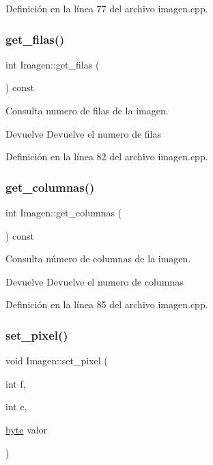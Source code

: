 Definición en la línea 77 del archivo imagen.\+cpp.

\mbox{\label{classImagen_a9cfbba6e40009767ec56197631f63d7e}} 
\subsubsection{\texorpdfstring{get\+\_\+filas()}{get\_filas()}}
{\footnotesize\ttfamily int Imagen\+::get\+\_\+filas (\begin{DoxyParamCaption}{ }\end{DoxyParamCaption}) const}



Consulta numero de filas de la imagen. 

\begin{DoxyReturn}{Devuelve}
Devuelve el numero de filas 
\end{DoxyReturn}


Definición en la línea 82 del archivo imagen.\+cpp.

\mbox{\label{classImagen_a4150d2b82ea80b969ddb8385b83e5485}} 
\subsubsection{\texorpdfstring{get\+\_\+columnas()}{get\_columnas()}}
{\footnotesize\ttfamily int Imagen\+::get\+\_\+columnas (\begin{DoxyParamCaption}{ }\end{DoxyParamCaption}) const}



Consulta número de columnas de la imagen. 

\begin{DoxyReturn}{Devuelve}
Devuelve el numero de columnas 
\end{DoxyReturn}


Definición en la línea 85 del archivo imagen.\+cpp.

\mbox{\label{classImagen_a5b8399ee72d0f855aa9fd1b3bfd0c4cc}} 
\subsubsection{\texorpdfstring{set\+\_\+pixel()}{set\_pixel()}}
{\footnotesize\ttfamily void Imagen\+::set\+\_\+pixel (\begin{DoxyParamCaption}\item[{int}]{f,  }\item[{int}]{c,  }\item[{\hyperlink{imagen_8h_a0c8186d9b9b7880309c27230bbb5e69d}{byte}}]{valor }\end{DoxyParamCaption})}




